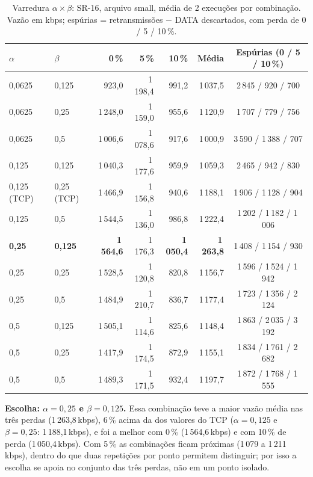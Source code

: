 \documentclass[11pt,a4paper]{article}
\begin{document}
\begin{table}[H]
\centering\small
\caption{Varredura $\alpha \times \beta$: SR-16, arquivo small, média de 2 execuções por combinação.
Vazão em kbps; espúrias = retransmissões $-$ DATA descartados, com perda de 0 / 5 / 10\,\%.}
\label{tab:varredura}
\begin{tabular}{@{}ll rrrr c@{}}
\toprule
$\alpha$ & $\beta$ & \textbf{0\,\%} & \textbf{5\,\%} & \textbf{10\,\%} & \textbf{Média} & \textbf{Espúrias (0 / 5 / 10\,\%)}\\
\midrule
0,0625 & 0,125 & 923,0    & 1\,198,4 & 991,2    & 1\,037,5 & 2\,845 / 920 / 700\\
0,0625 & 0,25  & 1\,248,0 & 1\,159,0 & 955,6    & 1\,120,9 & 1\,707 / 779 / 756\\
0,0625 & 0,5   & 1\,006,6 & 1\,078,6 & 917,6    & 1\,000,9 & 3\,590 / 1\,388 / 707\\
0,125  & 0,125 & 1\,040,3 & 1\,177,6 & 959,9    & 1\,059,3 & 2\,465 / 942 / 830\\
0,125 (TCP) & 0,25 (TCP) & 1\,466,9 & 1\,156,8 & 940,6 & 1\,188,1 & 1\,906 / 1\,128 / 904\\
0,125  & 0,5   & 1\,544,5 & 1\,136,0 & 986,8    & 1\,222,4 & 1\,202 / 1\,182 / 1\,006\\
\textbf{0,25} & \textbf{0,125} & \textbf{1\,564,6} & 1\,176,3 & \textbf{1\,050,4} & \textbf{1\,263,8} & 1\,408 / 1\,154 / 930\\
0,25   & 0,25  & 1\,528,5 & 1\,120,8 & 820,8    & 1\,156,7 & 1\,596 / 1\,524 / 1\,942\\
0,25   & 0,5   & 1\,484,9 & 1\,210,7 & 836,7    & 1\,177,4 & 1\,723 / 1\,356 / 2\,124\\
0,5    & 0,125 & 1\,505,1 & 1\,114,6 & 825,6    & 1\,148,4 & 1\,863 / 2\,035 / 3\,192\\
0,5    & 0,25  & 1\,417,9 & 1\,174,5 & 872,9    & 1\,155,1 & 1\,834 / 1\,761 / 2\,682\\
0,5    & 0,5   & 1\,489,3 & 1\,171,5 & 932,4    & 1\,197,7 & 1\,872 / 1\,768 / 1\,555\\
\bottomrule
\end{tabular}
\end{table}

\textbf{Escolha: $\alpha = 0{,}25$ e $\beta = 0{,}125$.} Essa combinação teve a maior vazão média nas
três perdas (1\,263,8\,kbps), 6\,\% acima da dos valores do TCP ($\alpha = 0{,}125$ e $\beta = 0{,}25$:
1\,188,1\,kbps), e foi a melhor com 0\,\% (1\,564,6\,kbps) e com 10\,\% de perda (1\,050,4\,kbps). Com
5\,\% as combinações ficam próximas (1\,079 a 1\,211\,kbps), dentro do que duas repetições por ponto
permitem distinguir; por isso a escolha se apoia no conjunto das três perdas, não em um ponto isolado.
\end{document}
